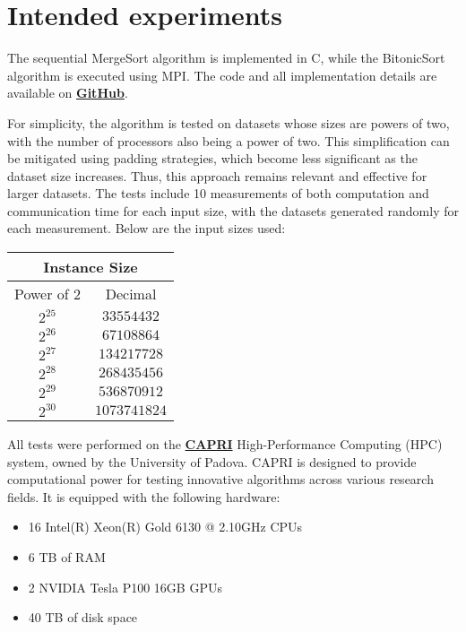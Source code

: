 \documentclass[12pt,conference]{ieeeconf} %
\begin{document}

\section{Intended experiments}
The sequential MergeSort algorithm is implemented in C, while the BitonicSort algorithm is executed using MPI. The code and all implementation details are available on \textbf{\href{https://github.com/francesco-biscaccia-carrara/BitonicSort}{GitHub}}. \par
For simplicity, the algorithm is tested on datasets whose sizes are powers of two, with the number of processors also being a power of two. This simplification can be mitigated using padding strategies, which become less significant as the dataset size increases. Thus, this approach remains relevant and effective for larger datasets.
The tests include 10 measurements of both computation and communication time for each input size, with the datasets generated randomly for each measurement. Below are the input sizes used:
\begin{center}
\begin{tabular}{|c||c|}
 \hline
 \multicolumn{2}{|c|}{Instance Size} \\
 \hline
 Power of 2& Decimal\\
 \hline
 $2^{25}$ & $33554432$\\
 $2^{26}$ & $67108864$\\
 $2^{27}$ & $134217728$\\
 $2^{28}$ & $268435456$\\
 $2^{29}$ & $536870912$\\
 $2^{30}$ & $1073741824$\\
 \hline
\end{tabular}
\end{center}
All tests were performed on the \textbf{\href{https://capri.dei.unipd.it}{CAPRI}} High-Performance Computing (HPC) system, owned by the University of Padova. CAPRI is designed to provide computational power for testing innovative algorithms across various research fields. It is equipped with the following hardware:
\begin{itemize}
    \item 16 Intel(R) Xeon(R) Gold 6130 @ 2.10GHz CPUs
    \item 6 TB of RAM
    \item 2 NVIDIA Tesla P100 16GB GPUs
    \item 40 TB of disk space
\end{itemize}
\end{document}
